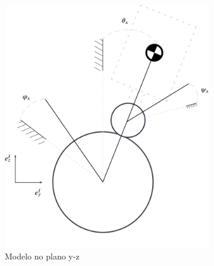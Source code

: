 \begin{figure}[H]
    \centering
    \begin{subfigure}[b]{0.4\textwidth}
        \centering
        \includegraphics[width=\linewidth]{Metodologia/Figuras/modelo_plano_yz.png}
        \caption{Modelo no plano y-z}
        \label{fig:modelo_yz}
    \end{subfigure}
    \hfill
    \begin{subfigure}[b]{0.4\textwidth}
        \centering

\end{subfigure}
\end{figure}
